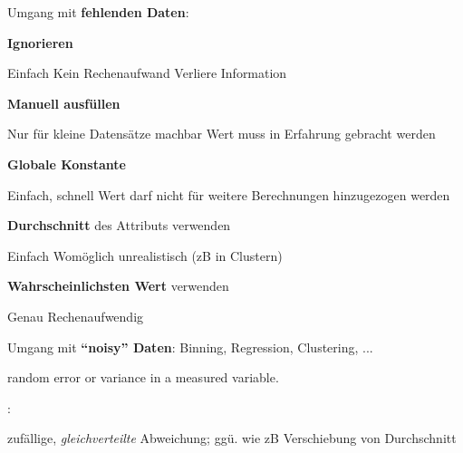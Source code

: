 \documentclass[10pt]{article} %
\begin{document}
Umgang mit \textbf{fehlenden Daten}:
\begin{cptitemize} 
      \item \textbf{Ignorieren}
      \begin{cptitemize} 
            \advantageit Einfach
            \advantageit Kein Rechenaufwand
            \disadvantageit Verliere Information 
      \end{cptitemize} 
      \item \textbf{Manuell ausfüllen}
      \begin{cptitemize} 
            \disadvantageit Nur für kleine Datensätze machbar
            \disadvantageit Wert muss in Erfahrung gebracht werden 
      \end{cptitemize} 
      \item \textbf{Globale Konstante}
      \begin{cptitemize} 
            \advantageit Einfach, schnell
            \disadvantageit Wert darf nicht für weitere Berechnungen hinzugezogen werden
      \end{cptitemize} 
      \item \textbf{Durchschnitt} des Attributs verwenden
      \begin{cptitemize} 
            \advantageit Einfach 
            \disadvantageit Womöglich unrealistisch (zB in Clustern)
      \end{cptitemize} 
      \item \textbf{Wahrscheinlichsten Wert} verwenden
      \begin{cptitemize} 
            \advantageit Genau
            \disadvantageit Rechenaufwendig 
      \end{cptitemize} 
\end{cptitemize}

Umgang mit \textbf{``noisy'' Daten}: Binning, Regression, Clustering, ...

\begin{definition}[Noise]
  random error or variance in a measured variable.
\end{definition}:
\begin{definition}
  zufällige, \textit{gleichverteilte} Abweichung; ggü.  wie zB Verschiebung von Durchschnitt
\end{definition}
\end{document}
